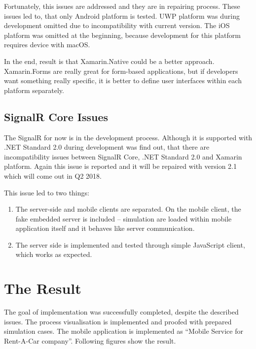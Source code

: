 Fortunately, this issues are addressed and they are in repairing process. These issues led to, that only Android platform is tested. UWP platform was during development omitted due to incompatibility with current version. The iOS platform was omitted at the beginning, because development for this platform requires device with macOS. 

In the end, result is that Xamarin.Native could be a better approach. Xamarin.Forms are really great for form-based applications, but if developers want something really specific, it is better to define user interfaces within each platform separately. 
\subsection{SignalR Core Issues}
The SignalR for now is in the development process. Although it is supported with .NET Standard 2.0 during development was find out, that there are incompatibility issues between SignalR Core, .NET Standard 2.0 and Xamarin platform. Again this issue is reported and it will be repaired with version 2.1 which will come out in Q2 2018.

This issue led to two things:
\begin{enumerate}
\item The server-side and mobile clients are separated. On the mobile client, the fake embedded server is included -- simulation are loaded within mobile application itself and it behaves like server communication. 
\item The server side is implemented and tested through simple JavaScript client, which works as expected. 
\end{enumerate}
\section{The Result}
The goal of implementation was successfully completed, despite the described issues. The process visualisation is implemented and proofed with prepared simulation cases. The mobile application is implemented as ``Mobile Service for Rent-A-Car  company''. Following figures show the result. 


